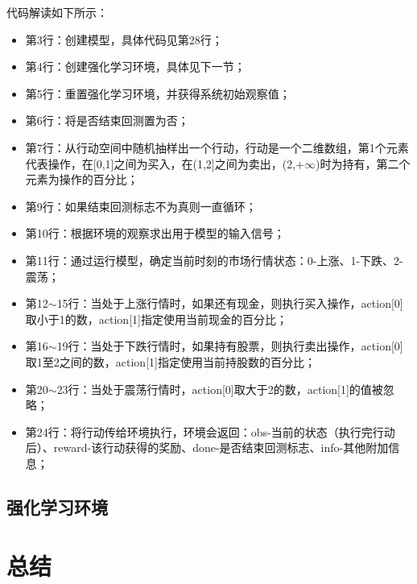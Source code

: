 代码解读如下所示：
\begin{itemize}
    \item 第3行：创建模型，具体代码见第28行；
    \item 第4行：创建强化学习环境，具体见下一节；
    \item 第5行：重置强化学习环境，并获得系统初始观察值；
    \item 第6行：将是否结束回测置为否；
    \item 第7行：从行动空间中随机抽样出一个行动，行动是一个二维数组，第1个元素代表操作，在[0,1]之间为买入，在(1,2]之间为卖出，(2,+$\infty$)时为持有，第二个
    元素为操作的百分比；
    \item 第9行：如果结束回测标志不为真则一直循环；
    \item 第10行：根据环境的观察求出用于模型的输入信号；
    \item 第11行：通过运行模型，确定当前时刻的市场行情状态：0-上涨、1-下跌、2-震荡；
    \item 第12$\sim$15行：当处于上涨行情时，如果还有现金，则执行买入操作，action[0]取小于1的数，action[1]指定使用当前现金的百分比；
    \item 第16$\sim$19行：当处于下跌行情时，如果持有股票，则执行卖出操作，action[0]取1至2之间的数，action[1]指定使用当前持股数的百分比；
    \item 第20$\sim$23行：当处于震荡行情时，action[0]取大于2的数，action[1]的值被忽略；
    \item 第24行：将行动传给环境执行，环境会返回：obs-当前的状态（执行完行动后）、reward-该行动获得的奖励、done-是否结束回测标志、info-其他附加信息；
\end{itemize}

\subsection{强化学习环境}


\section{总结}
